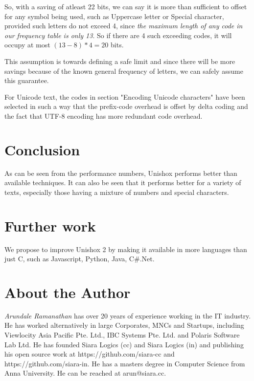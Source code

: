\documentclass[]{article}
\begin{document}
So, with a saving of atleast 22 bits, we can say it is more than sufficient to offset for any symbol being used, such as Uppercase letter or Special character, provided such letters do not exceed 4, since \emph{the maximum length of any code in our frequency table is only 13}.  So if there are 4 such exceeding codes, it will occupy at most $(13 - 8) * 4 = 20$ bits.

This assumption is towards defining a safe limit and since there will be more savings because of the known general frequency of letters, we can safely assume this guarantee.

For Unicode text, the codes in section "Encoding Unicode characters" have been selected in such a way that the prefix-code overhead is offset by delta coding and the fact that UTF-8 encoding has more redundant code overhead.

\section{Conclusion}

As can be seen from the performance numbers, Unishox performs better than available techniques.  It can also be seen that it performs better for a variety of texts, especially those having a mixture of numbers and special characters.

\section{Further work}

We propose to improve Unishox 2 by making it available in more languages than just C, such as Javascript, Python, Java, C\#.Net.

\section{About the Author}

\emph{Arundale Ramanathan} has over 20 years of experience working in the IT industry.  He has worked alternatively in large Corporates, MNCs and Startups, including Viewlocity Asia Pacific Pte. Ltd., IBC Systems Pte. Ltd. and Polaris Software Lab Ltd. He has founded Siara Logics (cc) and Siara Logics (in) and publishing his open source work at https://github.com/siara-cc and https://github.com/siara-in. He has a masters degree in Computer Science from Anna University.  He can be reached at arun@siara.cc.
\end{document}
